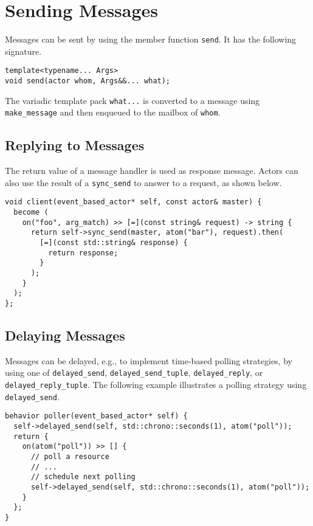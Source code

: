 \section{Sending Messages}
\label{Sec::Send}

Messages can be sent by using the member function \lstinline^send^.
It has the following signature.

\begin{lstlisting}
template<typename... Args>
void send(actor whom, Args&&... what);
\end{lstlisting}

The variadic template pack \lstinline^what...^ is converted to a message using \lstinline^make_message^ and then enqueued to the mailbox of \lstinline^whom^.

\subsection{Replying to Messages}
\label{Sec::Send::Reply}

The return value of a message handler is used as response message.
Actors can also use the result of a \lstinline^sync_send^ to answer to a request, as shown below.

\begin{lstlisting}
void client(event_based_actor* self, const actor& master) {
  become (
    on("foo", arg_match) >> [=](const string& request) -> string {
      return self->sync_send(master, atom("bar"), request).then(
        [=](const std::string& response) {
          return response;
        }
      );
    }
  );
};
\end{lstlisting}

\subsection{Delaying Messages}

Messages can be delayed, e.g., to implement time-based polling strategies, by using one of \lstinline^delayed_send^, \lstinline^delayed_send_tuple^, \lstinline^delayed_reply^, or \lstinline^delayed_reply_tuple^.
The following example illustrates a polling strategy using \lstinline^delayed_send^.

\begin{lstlisting}
behavior poller(event_based_actor* self) {
  self->delayed_send(self, std::chrono::seconds(1), atom("poll"));
  return {
    on(atom("poll")) >> [] {
      // poll a resource
      // ...
      // schedule next polling
      self->delayed_send(self, std::chrono::seconds(1), atom("poll"));
    }
  };
}
\end{lstlisting}

